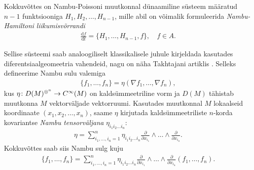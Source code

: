 Kokkuvõttes on Nambu-Poissoni muutkonnal dünaamiline süsteem määratud
$n-1$ funktsiooniga $H_1, H_2, \dots, H_{n-1}$, mille abil on võimalik
formuleerida \emph{Nambu-Hamiltoni liikumisvõrrandi}
\begin{align*}
    \frac{\mathrm{d} f}{\mathrm{d} t} = \{H_1, \dots, H_{n-1}, f\},
    \quad f \in A.
\end{align*}

Sellise süsteemi saab analoogiliselt klassikalisele juhule kirjeldada
kasutades diferentsiaalgeomeetria vahendeid, nagu on näha
Takhtajani artiklis \cite{takhtajan1994}. Selleks defineerime Nambu
sulu valemiga
\begin{align*}
    \{f_1, \dots, f_n\} = \eta\left( \nabla f_1, \dots, \nabla f_n \right),
\end{align*}
kus $\eta \colon D(M)^{\otimes^n} \to C^\infty(M)$ on kaldsümmeetriline vorm ja
$D(M)$ tähistab muutkonna $M$ vektorväljade vektorruumi. Kasutades
muutkonnal $M$ lokaalseid koordinaate $(x_1, x_2, \dots, x_n)$, saame
$\eta$ kirjutada kaldsümmeetriliste $n$-korda kovariantse
\emph{Nambu tensorväljana} $\eta_{i_1 i_2 \dots i_n}$:
\begin{align*}
    \eta = \sum_{i_1, \dots, i_n = 1}^{n} \eta_{i_1 i_2 \dots i_n}
        \frac{\partial}{\partial x_{i_1}}
        \wedge \dots \wedge
        \frac{\partial}{\partial x_{i_n}}.
\end{align*}
Kokkuvõttes saab siis Nambu sulg kuju
\begin{align*}
    \{f_1, \dots, f_n\} =
    \sum_{i_1, \dots, i_n = 1}^{n} \eta_{i_1 i_2 \dots i_n}
        \frac{\partial}{\partial x_{i_1}}
        \wedge \dots \wedge
        \frac{\partial}{\partial x_{i_n}} (f_1, \dots, f_n).
\end{align*}
